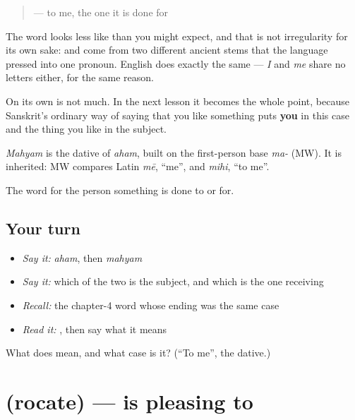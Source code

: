 \begin{quote}
\textbf{} — to me, the one it is done for
\end{quote}

The word looks less like \textbf{} than you might expect, and that is not irregularity for its own sake: \textbf{} and \textbf{} come from two different ancient stems that the language pressed into one pronoun. English does exactly the same — \emph{I} and \emph{me} share no letters either, for the same reason.

On its own \textbf{} is not much. In the next lesson it becomes the whole point, because Sanskrit's ordinary way of saying that you like something puts \textbf{you} in this case and the thing you like in the subject.

\begin{cousinweb}
\emph{Mahyam} is the dative of \emph{aham}, built on the first-person base \emph{ma-} (MW). It is inherited: MW compares Latin \emph{mē}, \textquotedblleft{}me\textquotedblright{}, and \emph{mihi}, \textquotedblleft{}to me\textquotedblright{}.
\end{cousinweb}

\begin{grammarlens}[title={What you've built}]
The word for the person something is done to or for.
\end{grammarlens}

\subsection*{Your turn}
\begin{itemize}
\raggedright
  \item \emph{Say it:} \emph{aham}, then \emph{mahyam}
  \item \emph{Say it:} which of the two is the subject, and which is the one receiving
  \item \emph{Recall:} the chapter-4 word whose ending was the same case
  \item \emph{Read it:} \textbf{}, then say what it means
\end{itemize}

\begin{tcolorbox}[breakable,colback=teal!4,colframe=teal!35!black,title={Before you move on}]
What does \textbf{} mean, and what case is it? (\textquotedblleft{}To me\textquotedblright{}, the dative.)
\end{tcolorbox}
\section[\texorpdfstring{\sk{रोचते} (rocate)}{रोचते (rocate)}]{ (rocate) — is pleasing to}

